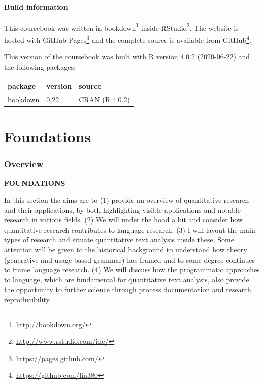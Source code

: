\documentclass[
]{article}
\DeclareRobustCommand{\href}[2]{#2\footnote{\url{#1}}}
\begin{document}
\hypertarget{build-information}{%
\subsection{Build information}\label{build-information}}

This coursebook was written in \href{http://bookdown.org/}{bookdown} inside \href{http://www.rstudio.com/ide/}{RStudio}. The website is hosted with \href{https://pages.github.com/}{GitHub Pages} and the complete source is available from \href{https://github.com/lin380}{GitHub}.

This version of the coursebook was built with R version 4.0.2 (2020-06-22) and the following packages:

\begin{longtable}[]{@{}lll@{}}
\toprule
package & version & source \\
\midrule
\endhead
bookdown & 0.22 & CRAN (R 4.0.2) \\
\bottomrule
\end{longtable}

\hypertarget{part-foundations}{%
\part{Foundations}\label{part-foundations}}

\hypertarget{foundations-overview}{%
\section*{Overview}\label{foundations-overview}}

\textbf{FOUNDATIONS}

In this section the aims are to (1) provide an overview of quantitative research and their applications, by both highlighting visible applications and notable research in various fields. (2) We will under the hood a bit and consider how quantitative research contributes to language research. (3) I will layout the main types of research and situate quantitative text analysis inside these. Some attention will be given to the historical background to understand how theory (generative and usage-based grammar) has framed and to some degree continues to frame language research. (4) We will discuss how the programmatic approaches to language, which are fundamental for quantitative text analysis, also provide the opportunity to further science through process documentation and research reproducibility.
\end{document}
